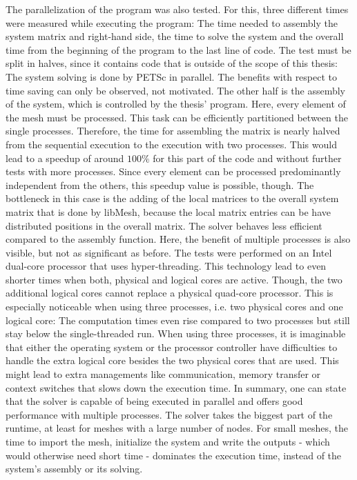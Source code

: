   The parallelization of the program was also tested. For this, three different times were measured while executing the program: The time needed to assembly the system matrix and right-hand side, the time to solve the system and the overall time from the beginning of the program to the last line of code. The test must be split in halves, since it contains code that is outside of the scope of this thesis: The system solving is done by PETSc in parallel. The benefits with respect to time saving can only be observed, not motivated. The other half is the assembly of the system, which is controlled by the thesis' program. Here, every element of the mesh must be processed. This task can be efficiently partitioned between the single processes. Therefore, the time for assembling the matrix is nearly halved from the sequential execution to the execution with two processes. This would lead to a speedup of around $100\%$ for this part of the code and without further tests with more processes. Since every element can be processed predominantly independent from the others, this speedup value is possible, though. The bottleneck in this case is the adding of the local matrices to the overall system matrix that is done by libMesh, because the local matrix entries can be have distributed positions in the overall matrix. The solver behaves less efficient compared to the assembly function. Here, the benefit of multiple processes is also visible, but not as significant as before. The tests were performed on an Intel dual-core processor that uses hyper-threading. This technology lead to even shorter times when both, physical and logical cores are active. Though, the two additional logical cores cannot replace a physical quad-core processor. This is especially noticeable when using three processes, i.e. two physical cores and one logical core: The computation times even rise compared to two processes but still stay below the single-threaded run. When using three processes, it is imaginable that either the operating system or the processor controller have difficulties to handle the extra logical core besides the two physical cores that are used. This might lead to extra managements like communication, memory transfer or context switches that slows down the execution time. In summary, one can state that the solver is capable of being executed in parallel and offers good performance with multiple processes. The solver takes the biggest part of the runtime, at least for meshes with a large number of nodes. For small meshes, the time to import the mesh, initialize the system and write the outputs - which would otherwise need short time - dominates the execution time, instead of the system's assembly or its solving.
  
